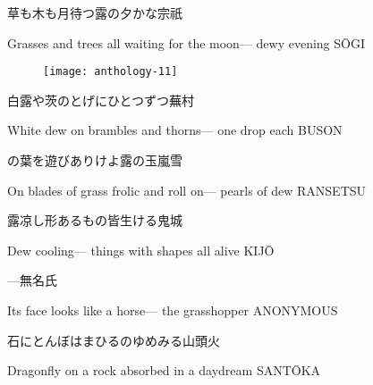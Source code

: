 \begin{haiku}
    {\FH 草も木も月待つ露の夕かな}\hfill{\FH 宗祇}

    \vin{} Grasses and trees all
    \vin{} \vin{} waiting for the moon---
    \vin{} \vin{} \vin{} dewy evening \hspace{\fill} S\={O}GI
\end{haiku}

\begin{figure}
    \texttt{[image: anthology-11]}
\end{figure}

\begin{haiku}
    {\FH 白露や茨のとげにひとつずつ}\hfill{\FH 蕪村}

    \vin{} White dew
    \vin{} \vin{} on brambles and thorns---
    \vin{} \vin{} \vin{} one drop each \hspace{\fill} BUSON
\end{haiku}

\begin{haiku}
    {\FH {}の葉を遊びありけよ露の玉}\hfill{\FH 嵐雪}

    \vin{} On blades of grass
    \vin{} \vin{} frolic and roll on---
    \vin{} \vin{} \vin{} pearls of dew \hspace{\fill} RANSETSU
\end{haiku}

\begin{haiku}
    {\FH 露凉し形あるもの皆生ける}\hfill{\FH 鬼城}

    \vin{} Dew cooling---
    \vin{} \vin{} things with shapes
    \vin{} \vin{} \vin{} all alive \hspace{\fill} KIJ\={O}
\end{haiku}

\begin{haiku}
    {---}\hfill{\FH 無名氏}

    \vin{} Its face
    \vin{} \vin{} looks like a horse---
    \vin{} \vin{} \vin{} the grasshopper \hspace{\fill} ANONYMOUS
\end{haiku}

\begin{haiku}
    {\FH 石にとんぼはまひるのゆめみる}\hfill{\FH 山頭火}

    \vin{} Dragonfly on a rock
    \vin{} \vin{} absorbed in
    \vin{} \vin{} \vin{} a daydream \hspace{\fill} SANT\={O}KA
\end{haiku}

